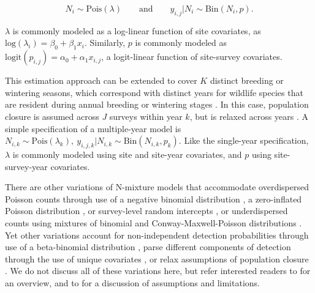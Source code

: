 \documentclass[codesnippet]{jss}
\begin{document}
\begin{equation} \label{eq1}
N_i \sim \text{Pois}(\lambda) \qquad \text{and} \qquad  y_{i,j} | N_i 
\sim \text{Bin}(N_i, p).
\end{equation}


$\lambda$ is commonly modeled as a log-linear function of site covariates, as $\text{log}(\lambda_i) = \beta_0 + \beta_1 x_i$. Similarly, $p$ is commonly modeled as $\text{logit}(p_{i,j}) = \alpha_0 + \alpha_1 x_{i,j}$, a logit-linear function of site-survey covariates.

This estimation approach can be extended to cover $K$ distinct breeding or 
wintering seasons, which correspond with distinct years for wildlife species 
that are resident during annual breeding or wintering stages 
\citep{Kery_Dorazio_Soldaat_Van_Strien_Zuiderwijk_Royle_2009}. In this case, 
population closure is assumed across $J$ surveys within year $k$, but is 
relaxed across years 
\citep{Kery_Dorazio_Soldaat_Van_Strien_Zuiderwijk_Royle_2009}. A simple 
specification of a multiple-year model is $N_{i,k} \sim 
\text{Pois}(\lambda_{k}), \ y_{i,j,k} | N_{i,k} \sim \text{Bin}(N_{i,k}, 
p_{k})$. Like the single-year specification, $\lambda$ is commonly 
modeled using site and site-year covariates, and $p$ using site-survey-year 
covariates. 

There are other variations of N-mixture models that accommodate 
overdispersed Poisson counts through use of a negative binomial distribution 
\citep{Kery_Royle_2010}, a zero-inflated Poisson distribution 
\citep{Wenger_Freeman_2008}, or survey-level random intercepts 
\citep{Kery_Schaub_2011}, or underdispersed counts using mixtures of 
binomial and Conway-Maxwell-Poisson distributions 
 \citep{wu2015bayesian}. Yet other variations 
account for non-independent detection probabilities through use of a 
beta-binomial distribution 
\citep{Martin_Royle_Mackenzie_Edwards_Kery_Gardner_2011}, parse different 
components of detection through the use of unique covariates 
\citep{O'Donnell_Thompson_III_Semlitsch_2015}, or relax assumptions of 
population closure  
\citep{Chandler_Royle_King_2011, Dail_Madsen_2011}. We do not discuss all of 
these variations here, but refer interested readers to 
\cite{Denes_Silveira_Beissinger_2015} for an overview, and to 
\cite{Barker_Schofield_Link_Sauer_et_al_2017} for a discussion of 
assumptions and limitations.
\end{document}
